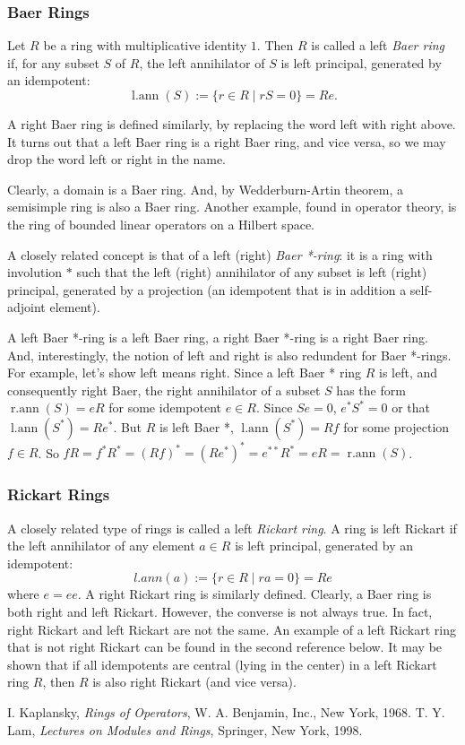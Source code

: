 \documentclass[12pt]{article}
\begin{document}
\subsubsection*{Baer Rings}

Let $R$ be a ring with multiplicative identity $1$.  Then $R$ is called a left \emph{Baer ring} if, for any subset $S$ of $R$, the left annihilator of $S$ is left principal, generated by an idempotent:
$$\operatorname{l.ann}(S):=\lbrace r\in R\mid rS=0\rbrace=Re.$$

A right Baer ring is defined similarly, by replacing the word left with right above.  It turns out that a left Baer ring is a right Baer ring, and vice versa, so we may drop the word left or right in the name.

Clearly, a domain is a Baer ring.  And, by Wedderburn-Artin theorem, a semisimple ring is also a Baer ring.  Another example, found in operator theory, is the ring of bounded linear operators on a Hilbert space.

A closely related concept is that of a left (right) \emph{Baer *-ring}: it is a ring with involution $*$ such that the left (right) annihilator of any subset is left (right) principal, generated by a projection (an idempotent that is in addition a self-adjoint element).

A left Baer *-ring is a left Baer ring, a right Baer *-ring is a right Baer ring. And, interestingly, the notion of left and right is also redundent for Baer *-rings.  For example, let's show left means right.  Since a left Baer * ring $R$ is left, and consequently right Baer, the right annihilator of a subset $S$ has the form $\operatorname{r.ann}(S)=eR$ for some idempotent $e\in R$.  Since $Se=0$, $e^*S^*=0$ or that $\operatorname{l.ann}(S^*)=Re^*$.  But $R$ is left Baer *, $\operatorname{l.ann}(S^*)=Rf$ for some projection $f\in R$.  So $fR=f^*R^*=(Rf)^*=(Re^*)^*=e^{**}R^*=eR=\operatorname{r.ann}(S)$.

\subsubsection*{Rickart Rings}

A closely related type of rings is called a left \emph{Rickart ring}.  A ring is left Rickart if the left annihilator of any element $a\in R$ is left principal, generated by an idempotent:
$$l.ann(a):=\lbrace r\in R\mid ra=0\rbrace = Re$$
where $e=ee$.  A right Rickart ring is similarly defined.  Clearly, a Baer ring is both right and left Rickart.  However, the converse is not always true.  In fact, right Rickart and left Rickart are not the same.  An example of a left Rickart ring that is not right Rickart can be found in the second reference below.  It may be shown that if all idempotents are central (lying in the center) in a left Rickart ring $R$, then $R$ is also right Rickart (and vice versa).

\begin{thebibliography}{9}
 I. Kaplansky, \emph{Rings of Operators}, W. A. Benjamin, Inc., New York, 1968.
 T. Y. Lam, \emph{Lectures on Modules and Rings}, Springer, New York, 1998.
\end{thebibliography}
\end{document}
